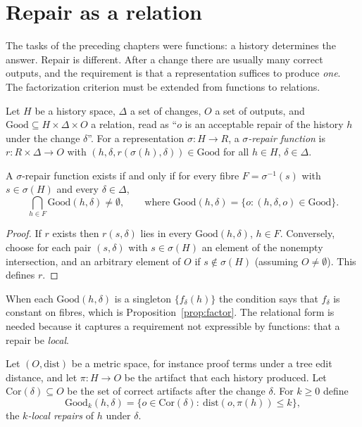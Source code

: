 \section{Repair as a relation}

The tasks of the preceding chapters were functions: a history determines the answer. Repair is different. After a change there are usually many correct outputs, and the requirement is that a representation suffices to produce \emph{one}. The factorization criterion must be extended from functions to relations.

\begin{definition}
\label{def:repair}
Let $H$ be a history space, $\Delta$ a set of changes, $O$ a set of outputs, and $\mathrm{Good}\subseteq H\times\Delta\times O$ a relation, read as ``$o$ is an acceptable repair of the history $h$ under the change $\delta$''. For a representation $\sigma:H\to R$, a \emph{$\sigma$-repair function} is $r:R\times\Delta\to O$ with $(h,\delta,r(\sigma(h),\delta))\in\mathrm{Good}$ for all $h\in H$, $\delta\in\Delta$.
\end{definition}

\begin{theorem}
\label{thm:rel-factor}
A $\sigma$-repair function exists if and only if for every fibre $F=\sigma^{-1}(s)$ with $s\in\sigma(H)$ and every $\delta\in\Delta$,
\[
\bigcap_{h\in F}\mathrm{Good}(h,\delta)\ne\emptyset,\qquad\text{where }\mathrm{Good}(h,\delta)=\{o:(h,\delta,o)\in\mathrm{Good}\}.
\]
\end{theorem}

\begin{proof}
If $r$ exists then $r(s,\delta)$ lies in every $\mathrm{Good}(h,\delta)$, $h\in F$. Conversely, choose for each pair $(s,\delta)$ with $s\in\sigma(H)$ an element of the nonempty intersection, and an arbitrary element of $O$ if $s\notin\sigma(H)$ (assuming $O\ne\emptyset$). This defines $r$.
\end{proof}

When each $\mathrm{Good}(h,\delta)$ is a singleton $\{f_\delta(h)\}$ the condition says that $f_\delta$ is constant on fibres, which is Proposition~\ref{prop:factor}. The relational form is needed because it captures a requirement not expressible by functions: that a repair be \emph{local}.

\begin{definition}[Locality]
\label{def:locality}
Let $(O,\mathrm{dist})$ be a metric space, for instance proof terms under a tree edit distance, and let $\pi:H\to O$ be the artifact that each history produced. Let $\mathrm{Cor}(\delta)\subseteq O$ be the set of correct artifacts after the change $\delta$. For $k\ge0$ define
\[
\mathrm{Good}_k(h,\delta)=\{o\in\mathrm{Cor}(\delta):\ \mathrm{dist}(o,\pi(h))\le k\},
\]
the \emph{$k$-local repairs} of $h$ under $\delta$.
\end{definition}

